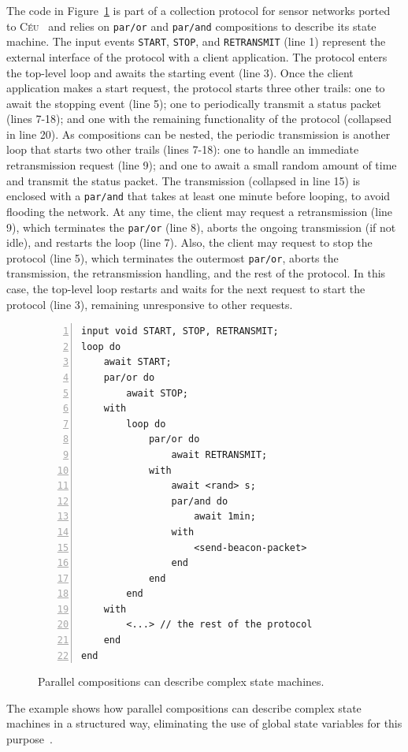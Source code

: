\documentclass{acm_proc_article-sp}
\newcommand{\CEU}{\textsc{C\'{e}u}\xspace}
\newcommand{\code}[1] {{\small{\texttt{#1}}}}
\newcommand{\1}{\;}
\newcommand{\2}{\;\;}
\newcommand{\3}{\;\;\;}
\newcommand{\5}{\;\;\;\;\;}
\begin{document}
The code in Figure~\ref{lst.ctp} is part of a collection protocol for sensor 
networks ported to \CEU~\cite{wsn.ctp,ceu.sensys13} and relies on \code{par/or} 
and \code{par/and} compositions to describe its state machine.
%
The input events \code{START}, \code{STOP}, and \code{RETRANSMIT} (line 1) 
represent the external interface of the protocol with a client application.
%
The protocol enters the top-level loop and awaits the starting event (line 3).
Once the client application makes a start request, the protocol starts three 
other trails:
one to await the stopping event (line 5);
one to periodically transmit a status packet (lines 7-18);
and one with the remaining functionality of the protocol (collapsed in line 
20).
%
As compositions can be nested, the periodic transmission is another loop that 
starts two other trails (lines 7-18):
one to handle an immediate retransmission request (line 9);
and one to await a small random amount of time and transmit the status packet.
%
The transmission (collapsed in line 15) is enclosed with a \code{par/and} that 
takes at least one minute before looping, to avoid flooding the network.
%
At any time, the client may request a retransmission (line 9), which terminates 
the \code{par/or} (line 8), aborts the ongoing transmission (if not idle), and 
restarts the loop (line 7).
%
Also, the client may request to stop the protocol (line 5), which terminates 
the outermost \code{par/or}, aborts the transmission, the retransmission 
handling, and the rest of the protocol.
In this case, the top-level loop restarts and waits for the next request to 
start the protocol (line 3), remaining unresponsive to other requests.

\begin{figure}[t]
\begin{lstlisting}[numbers=left,xleftmargin=3em]
input void START, STOP, RETRANSMIT;
loop do
    await START;
    par/or do
        await STOP;
    with
        loop do
            par/or do
                await RETRANSMIT;
            with
                await <rand> s;
                par/and do
                    await 1min;
                with
                    <send-beacon-packet>
                end
            end
        end
    with
        <...> // the rest of the protocol
    end
end
\end{lstlisting}
\caption{ Parallel compositions can describe complex state machines.
\label{lst.ctp}
}
\end{figure}

The example shows how parallel compositions can describe complex state machines 
in a structured way, eliminating the use of global state variables for this 
purpose~\cite{ceu.sensys13}.
\end{document}
